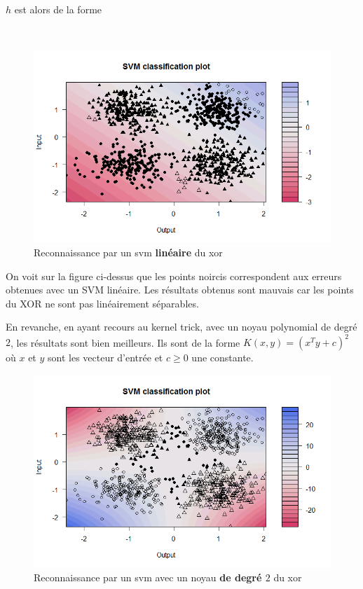 \documentclass{article}
\theoremstyle{definition}
\begin{document}
\noindent $h$ est alors de la forme

\\
\newpage
\begin{figure}[!h]\centering
\includegraphics[scale=0.6]{svmlinxor.png}
\caption{Reconnaissance par un svm \textbf{linéaire} du xor}
\label{fig:svmlinxor}
\end{figure}

\noindent On voit sur la figure ci-dessus que les points noircis correspondent aux erreurs obtenues avec un SVM linéaire. Les résultats obtenus sont mauvais car les points du XOR ne sont pas linéairement séparables.

\newpage

\noindent En revanche, en ayant recours au kernel trick, avec un noyau polynomial de degré $2$, les résultats sont bien meilleurs. Ils sont de la forme $K(x,y)=(x^T y+c)^2$ où $x$ et $y$ sont les vecteur d'entrée et $c\geq 0$ une constante.

\begin{figure}[!h]\centering
\includegraphics[scale=0.6]{svmxorplydot.png}
\caption{Reconnaissance par un svm  avec un noyau \textbf{de degré $2$} du xor}
\label{fig:svmpolydot}
\end{figure}
\end{document}
